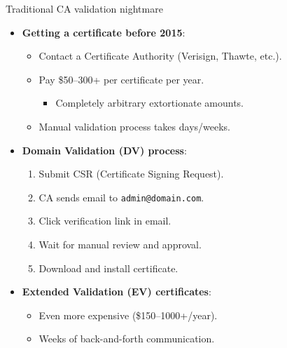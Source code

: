 \ifdefined\PRESENTATION\else\PassOptionsToClass{handout}{beamer}\fi\documentclass[aspectratio=169, lualatex]{beamer}
\begin{document}
\begin{frame}{Traditional CA validation nightmare}
	\begin{itemize}[<+->]
		\item \textbf{Getting a certificate before 2015}:
		      \begin{itemize}
			      \item Contact a Certificate Authority (Verisign, Thawte, etc.).
			      \item Pay \$50--300+ per certificate per year.
			            \begin{itemize}
				            \item Completely arbitrary extortionate amounts.
			            \end{itemize}
			      \item Manual validation process takes days/weeks.
		      \end{itemize}
		\item \textbf{Domain Validation (DV) process}:
		      \begin{enumerate}
			      \item Submit CSR (Certificate Signing Request).
			      \item CA sends email to \texttt{admin@domain.com}.
			      \item Click verification link in email.
			      \item Wait for manual review and approval.
			      \item Download and install certificate.
		      \end{enumerate}
		\item \textbf{Extended Validation (EV) certificates}:
		      \begin{itemize}
			      \item Even more expensive (\$150--1000+/year).
			      \item Weeks of back-and-forth communication.
		      \end{itemize}
	\end{itemize}
\end{frame}
\end{document}
